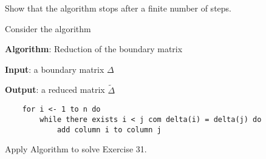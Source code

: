 \noindent\linia

\begin{exercise}
    Show that the algorithm stops after a finite number of steps.
\end{exercise}

Consider the algorithm

\textbf{Algorithm}: Reduction of the boundary matrix

{\bf Input}: a boundary matrix $\Delta$

{\bf Output}: a reduced matrix $\tilde{\Delta}$
\begin{verbatim}
    for i <- 1 to n do 
        while there exists i < j com delta(i) = delta(j) do
            add column i to column j
\end{verbatim}

\noindent\linia 

\begin{exercise}
    Apply Algorithm to solve Exercise 31.
\end{exercise}